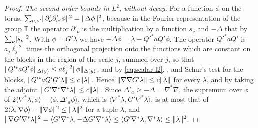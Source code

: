 \documentclass[11pt]{preprint}
\DeclarePairedDelimiter{\abs}{\lvert}{\rvert}
\DeclarePairedDelimiter{\norm}{\lVert}{\rVert}
\numberwithin{equation}{section}
\theoremstyle{definition}
\theoremstyle{remark}
\theoremstyle{plain}
\begin{document}
\begin{proof}
\emph{The second-order bounds in $L^2$, without decay.} For a function $\phi$ on the torus, $\sum_{\nu,\nu'}\norm{\partial'_\nu\partial'_{\nu'}\phi}^2 = \norm{\Delta\phi}^2$, because in the Fourier representation of the group $\mathbb T$ the operator $\partial'_\nu$ is the multiplication by a function $s_\nu$ and $-\Delta$ that by $\sum_\nu\abs{s_\nu}^2$. With $\phi = G'\lambda$ we have $-\Delta\phi = \lambda - Q'^*aQ'\phi$. The operator $Q'^*aQ'$ is $a_j\ell_j^{-2}$ times the orthogonal projection onto the functions which are constant on the blocks in the region of the scale $j$, summed over $j$, so that $\norm{Q'^*aQ'\phi}_{\Delta(y)} \leq a\ell_j^{-2}\norm\phi_{\Delta(y)}$, and by \eqref{eq:scalar-l2}, \cite[(2.61)]{BalabanPRT2}, and Schur's test for the blocks, $\norm{Q'^*aQ'G'\lambda} \leq c\norm\lambda$. Hence $\norm{\nabla\nabla G'\lambda} \leq c\norm\lambda$ for every $\lambda$, and by taking the adjoint $\norm{G'\nabla^*\nabla^*\lambda} \leq c\norm\lambda$. Since $\Delta'_a \geq -\Delta = \nabla^*\nabla$, the supremum over $\phi$ of $2\langle\nabla^*\lambda, \phi\rangle - \langle\phi, \Delta'_a\phi\rangle$, which is $\langle\nabla^*\lambda, G'\nabla^*\lambda\rangle$, is at most that of $2\langle\lambda, \nabla\phi\rangle - \norm{\nabla\phi}^2 \leq \norm\lambda^2$ for a tuple $\lambda$, and $\norm{\nabla G'\nabla^*\lambda}^2 = \langle G'\nabla^*\lambda, -\Delta G'\nabla^*\lambda\rangle \leq \langle G'\nabla^*\lambda, \nabla^*\lambda\rangle \leq \norm\lambda^2$.


\end{proof}
\end{document}
